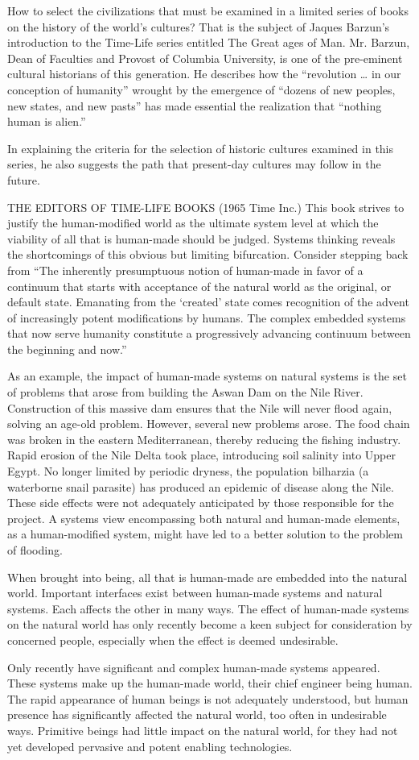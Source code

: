 How to select the civilizations that must be examined in a limited series of books on the history of the world’s cultures?  That is the subject of Jaques Barzun’s introduction to the Time-Life series entitled The Great ages of Man. Mr. Barzun, Dean of Faculties and Provost of Columbia University, is one of the pre-eminent cultural historians of this generation. He describes how the “revolution … in our conception of humanity” wrought by the emergence of “dozens of new peoples, new states, and new pasts” has made essential the realization that “nothing human is alien.”

In explaining the criteria for the selection of historic cultures examined in this series, he also suggests the path that present-day cultures may follow in the future.

THE EDITORS OF TIME-LIFE BOOKS (1965 Time Inc.) This book strives to justify the human-modified world as the ultimate system level at which the viability of all that is human-made should be judged. Systems thinking reveals the shortcomings of this obvious but limiting bifurcation. Consider stepping back from “The inherently presumptuous notion of human-made in favor of a continuum that starts with acceptance of the natural world as the original, or default state. Emanating from the ‘created’ state comes recognition of the advent of increasingly potent modifications by humans. The complex embedded systems that now serve humanity constitute a progressively advancing continuum between the beginning and now.”

As an example, the impact of human-made systems on natural systems is the set of problems that arose from building the Aswan Dam on the Nile River. Construction of this massive dam ensures that the Nile will never flood again, solving an age-old problem. However, several new problems arose. The food chain was broken in the eastern Mediterranean, thereby reducing the fishing industry. Rapid erosion of the Nile Delta took place, introducing soil salinity into Upper Egypt. No longer limited by periodic dryness, the population bilharzia (a waterborne snail parasite) has produced an epidemic of disease along the Nile. These side effects were not adequately anticipated by those responsible for the project. A systems view encompassing both natural and human-made elements, as a human-modified system, might have led to a better solution to the problem of flooding.

When brought into being, all that is human-made are embedded into the natural world. Important interfaces exist between human-made systems and natural systems. Each affects the other in many ways. The effect of human-made systems on the natural world has only recently become a keen subject for consideration by concerned people, especially when the effect is deemed undesirable.

Only recently have significant and complex human-made systems appeared. These systems make up the human-made world, their chief engineer being human. The rapid appearance of human beings is not adequately understood, but human presence has significantly affected the natural world, too often in undesirable ways. Primitive beings had little impact on the natural world, for they had not yet developed pervasive and potent enabling technologies.